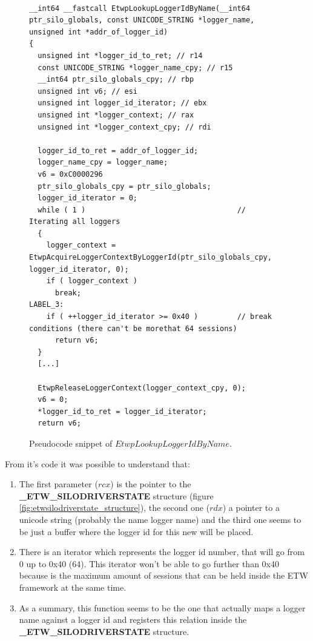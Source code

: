 \begin{figure}[H]
  \begin{lstlisting}
    
__int64 __fastcall EtwpLookupLoggerIdByName(__int64 ptr_silo_globals, const UNICODE_STRING *logger_name, unsigned int *addr_of_logger_id)
{
  unsigned int *logger_id_to_ret; // r14
  const UNICODE_STRING *logger_name_cpy; // r15
  __int64 ptr_silo_globals_cpy; // rbp
  unsigned int v6; // esi
  unsigned int logger_id_iterator; // ebx
  unsigned int *logger_context; // rax
  unsigned int *logger_context_cpy; // rdi

  logger_id_to_ret = addr_of_logger_id;
  logger_name_cpy = logger_name;
  v6 = 0xC0000296
  ptr_silo_globals_cpy = ptr_silo_globals;
  logger_id_iterator = 0;
  while ( 1 )                                   // Iterating all loggers
  {
    logger_context = EtwpAcquireLoggerContextByLoggerId(ptr_silo_globals_cpy, logger_id_iterator, 0);
    if ( logger_context )
      break;
LABEL_3:
    if ( ++logger_id_iterator >= 0x40 )         // break conditions (there can't be morethat 64 sessions)
      return v6;
  }
  [...]

  EtwpReleaseLoggerContext(logger_context_cpy, 0);
  v6 = 0;
  *logger_id_to_ret = logger_id_iterator;
  return v6;

  \end{lstlisting} 
  \caption[]{Pseudocode snippet of $EtwpLookupLoggerIdByName$.}
  \label{fig:logger_id_by_name}
\end{figure}

From it's code it was possible to understand that: 
\begin{enumerate}
  \setlength\itemsep{0.05em}
  \item The first parameter ($rcx$) is the pointer to the {\bfseries \_ETW\_SILODRIVERSTATE} structure (figure \ref{fig:etwsilodriverstate_structure}), the second one ($rdx$) a pointer to a unicode string (probably the name logger name) and the third one seems to be just a buffer where the logger id for this new will be placed. 
  \item There is an iterator which represents the logger id number, that will go from 0 up to 0x40 (64). This iterator won't be able to go further than 0x40 because is the maximum amount of sessions that can be held inside the ETW framework at the same time. 
  \item As a summary, this function seems to be the one that actually maps a logger name against a logger id and registers this relation inside the {\bfseries \_ETW\_SILODRIVERSTATE} structure. 
\end{enumerate}
  

